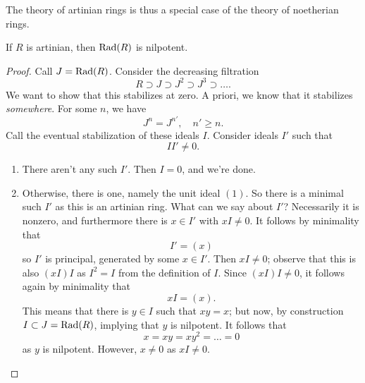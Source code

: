 The theory of artinian rings is thus a special case of the theory of noetherian
rings.


\begin{lemma} 
If $R$ is artinian, then $\operatorname{Rad} (R) $ is nilpotent.
\end{lemma} 
\begin{proof} 
Call $J = \operatorname{Rad}(R)$. Consider the decreasing filtration
\[ R \supset J \supset J^2 \supset J^3 \supset \dots.  \]
We want to show that this stabilizes at zero. A priori, we know that it
stabilizes \emph{somewhere}. For some $n$, we have
\[ J^n = J^{n'}, \quad n' \geq n.  \]
Call the eventual stabilization of these ideals $I$. Consider ideals $I'$ such
that
\[ II' \neq 0.  \]
\begin{enumerate}
\item There aren't any such $I'$. Then $I = 0$, and we're done. 
\item Otherwise, there is one, namely the unit ideal $(1)$. So there is a
minimal such $I'$ as this is an artinian ring. What can we say about $I'$?
Necessarily it is nonzero, and furthermore there is $x \in I'$ with $x I \neq
0$. It follows by minimality that
\[ I' = (x)  \]
so $I'$ is principal, generated by some $x \in I'$. Then $xI \neq 0$; observe
that this is also $(xI)I $ as $I^2  = I$ from the definition of $I$. Since
$(xI) I \neq 0$, it follows again by minimality that
\[ xI = (x).  \] This means that there is $y \in I$ such that $xy = x$; but now, by construction $I \subset J = \operatorname{Rad} (R)$, implying that $y $ is nilpotent.
It follows that
\[ x = xy = xy^2 = \dots = 0  \]
as $y$ is nilpotent. However, $x \neq 0$ as $xI \neq 0$. 
\end{enumerate}
\end{proof} 

